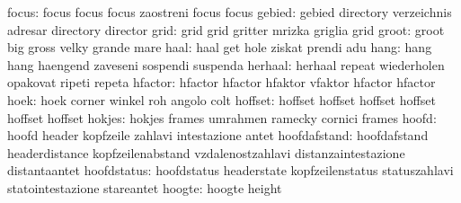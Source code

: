                     focus: focus                     focus
                           focus                     zaostreni
                           focus                     focus %
                   gebied: gebied                    directory
                           verzeichnis               adresar
                           directory                 director
                     grid: grid                      grid
                           gritter                   mrizka
                           griglia                   grid
                    groot: groot                     big
                           gross                     velky
                           grande                    mare
                     haal: haal                      get
                           hole                      ziskat
                           prendi                    adu
                     hang: hang                      hang
                           haengend                  zaveseni
                           sospendi                  suspenda
                  herhaal: herhaal                   repeat
                           wiederholen               opakovat
                           ripeti                    repeta
                  hfactor: hfactor                   hfactor
                           hfaktor                   vfaktor
                           hfactor                   hfactor  %
                     hoek: hoek                      corner
                           winkel                    roh
                           angolo                    colt
                  hoffset: hoffset                   hoffset
                           hoffset                   hoffset
                           hoffset                   hoffset %
                   hokjes: hokjes                    frames
                           umrahmen                  ramecky
                           cornici                   frames
                    hoofd: hoofd                     header
                           kopfzeile                 zahlavi
                           intestazione              antet
             hoofdafstand: hoofdafstand              headerdistance
                           kopfzeilenabstand         vzdalenostzahlavi
                           distanzaintestazione      distantaantet
              hoofdstatus: hoofdstatus               headerstate
                           kopfzeilenstatus          statuszahlavi
                           statointestazione         stareantet
                   hoogte: hoogte                    height

